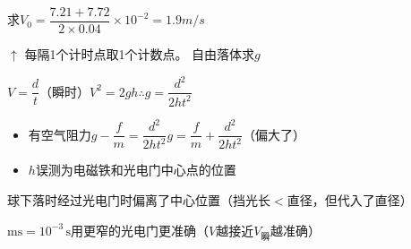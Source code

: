 求$V_0=\dfrac{7.21+7.72}{2\times0.04}\times10^{-2}=1.9\unit{m/s}$

$\uparrow$ 每隔1个计时点取1个计数点。
自由落体求$g$

$V=\dfrac{d}{t}$（瞬时）\qquad $V^2=2gh$\qquad $\therefore g=\dfrac{d^2}{2ht^2}$

\begin{itemize}
\item 有空气阻力\quad $g-\dfrac{f}{m}=\dfrac{d^2}{2ht^2}$\quad $g=\dfrac{f}{m}+\dfrac{d^2}{2ht^2}$（偏大了）
\item $h$误测为电磁铁和光电门中心点的位置\quad {}
\end{itemize}

球下落时经过光电门时偏离了中心位置（挡光长$<$直径，但代入了直径）\quad {}

$\mathrm{ms}=10^{-3}\,\mathrm{s}$\quad 用更窄的光电门更准确（$V$越接近$V_{\text{瞬}}$越准确）

